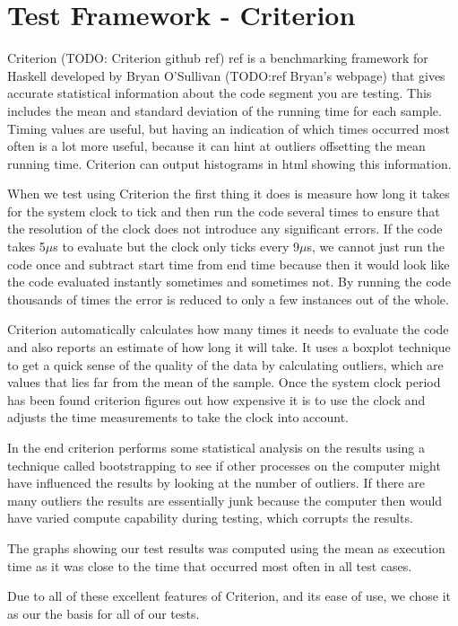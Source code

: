 
\section{Test Framework - Criterion}
Criterion (TODO: Criterion github ref) ref is a benchmarking framework for Haskell developed by Bryan O'Sullivan (TODO:ref Bryan's webpage) that gives accurate statistical information about the code segment you are testing. This includes the mean and standard deviation of the running time for each sample. Timing values are useful, but having an indication of which times occurred most often is a lot more useful, because it can hint at outliers offsetting the mean running time. Criterion can output histograms in html showing this information. 

When we test using Criterion the first thing it does is measure how long it takes for the system clock to tick and then run the code several times to ensure that the resolution of the clock does not introduce any significant errors. If the code takes 5$\mu$s to evaluate but the clock only ticks every 9$\mu$s, we cannot just run the code once and subtract start time from end time because then it would look like the code evaluated instantly sometimes and sometimes not. By running the code thousands of times the error is reduced to only a few instances out of the whole. 

Criterion automatically calculates how many times it needs to evaluate the code and also reports an estimate of how long it will take. It uses a boxplot technique to get a quick sense of the quality of the data by calculating outliers, which are values that lies far from the mean of the sample. Once the system clock period has been found criterion figures out how expensive it is to use the clock and adjusts the time measurements to take the clock into account. 

In the end criterion performs some statistical analysis on the results using a technique called bootstrapping to see if other processes on the computer might have influenced the results by looking at the number of outliers. If there are many outliers the results are essentially junk because the computer then would have varied compute capability during testing, which corrupts the results.  

The graphs showing our test results was computed using the mean as execution time as it was close to the time that occurred most often in all test cases.

Due to all of these excellent features of Criterion, and its ease of use, we chose it as our the basis for all of our tests. 